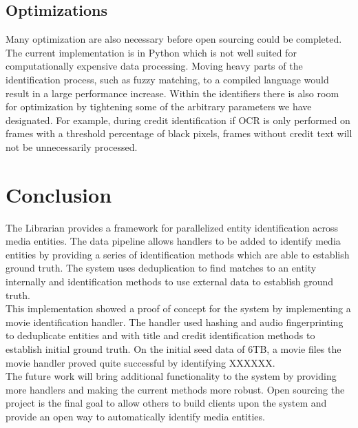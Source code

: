 \documentclass[paper=a4, fontsize=11pt]{scrartcl} %
\numberwithin{equation}{section} %
\numberwithin{figure}{section} %
\numberwithin{table}{section} %
\begin{document}
\subsection{Optimizations}
\label{sec:optimizations}
Many optimization are also necessary before open sourcing could be completed. The current implementation is in Python which is not well suited for computationally expensive data processing. Moving heavy parts of the identification process, such as fuzzy matching, to a compiled language would result in a large performance increase. Within the identifiers there is also room for optimization by tightening some of the arbitrary parameters we have designated. For example, during credit identification if OCR is only performed on frames with a threshold percentage of black pixels, frames without credit text will not be unnecessarily processed. \\


\section{Conclusion}
\label{sec:conclusion}

The Librarian provides a framework for parallelized entity identification across media entities. The data pipeline allows handlers to be added to identify media entities by providing a series of identification methods which are able to establish ground truth. The system uses deduplication to find matches to an entity internally and identification methods to use external data to establish ground truth. \\

This implementation showed a proof of concept for the system by implementing a movie identification handler. The handler used hashing and audio fingerprinting to deduplicate entities and with title and credit identification methods to establish initial ground truth. On the initial seed data of 6TB, a movie files the movie handler proved quite successful by identifying XXXXXX. \\

The future work will bring additional functionality to the system by providing more handlers and making the current methods more robust. Open sourcing the project is the final goal to allow others to build clients upon the system and provide an open way to automatically identify media entities. \\

\end{document}
